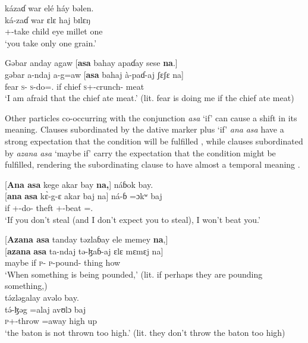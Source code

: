 \medskip
kázaɗ  war  elé  háy  bəlen.\\
\gll ká-zaɗ war ɛlɛ haj bɪlɛŋ\\
     {\twoS}+{\IFV}-take  child eye  millet  one\\
\glt  ‘you take only one grain.’
\z  

\ea \label{ex:12:48}
Gəbar  anday  agaw  [\textbf{asa}  bahay  apaɗay  sese  \textbf{na}.]\\
\gll  gəbar  a-ndaj    a-g=aw    [\textbf{asa}  bahaj   à-paɗ-aj  ʃɛʃɛ   na]\\
      fear    \textsc{s}-{\PROG}  \textsc{s}-do={\oneS}.{\IO}  if  chief  \textsc{s}+{\PFV}-crunch{}-{\CL}  meat  {\PSP}\\
\glt  ‘I am afraid that the chief ate meat.’ (lit. fear is doing me if the chief ate meat)  
\z 

Other particles co-occurring with the conjunction \textit{asa} ‘if’ can cause a shift in its meaning. Clauses subordinated by the dative marker plus ‘if’ \textit{ana} \textit{asa} have a strong  expectation that the condition will be fulfilled , while clauses subordinated by \textit{azana} \textit{asa} ‘maybe if’ carry the expectation that the condition might be fulfilled, rendering the subordinating clause to have almost a temporal meaning . 

\ea \label{ex:12:49}
 [\textbf{Ana  asa} kege  akar  bay  \textbf{na,}]  náɓok bay. \\
\gll  {}[\textbf{ana} \textbf{asa} k\`{ɛ}-g-ɛ    akar  baj  na]  ná-ɓ =ɔkʷ    baj\\
      {\DAT} if  {\twoS}+{\PFV}-do-{\CL}  theft  {\NEG}  {\PSP}  {\oneS}+{\IFV}-beat ={\twoS}.{\IO}  {\NEG}\\
\glt  ‘If you don’t steal (and I don’t expect you to steal), I won’t beat you.’
\z 

\ea \label{ex:12:50}
{}[\textbf{Azana  asa}  tanday  təzlaɓay  ele  memey  \textbf{na},]\\  
\gll  {}[\textbf{azana} \textbf{asa}     ta-ndaj    tə-ɮaɓ-aj    ɛlɛ    mɛmɛj   na]\\  
      maybe    if         \textsc{p}-{\PROG}  \textsc{p}-pound{}-{\CL}   thing   how      {\PSP} \\    
\glt ‘When something is being pounded,’ (lit. if perhaps they are pounding something,)\\

\medskip
t\'{ə}zləgalay  avəlo  bay.\\
\gll t\'{ə}-ɮəg =alaj avʊlɔ baj\\
      \textsc{p}+{\IFV}-throw =away   {high up}  {\NEG}\\
\glt  ‘the baton is not thrown too high.’ (lit. they don’t throw the baton too high)
\z 

